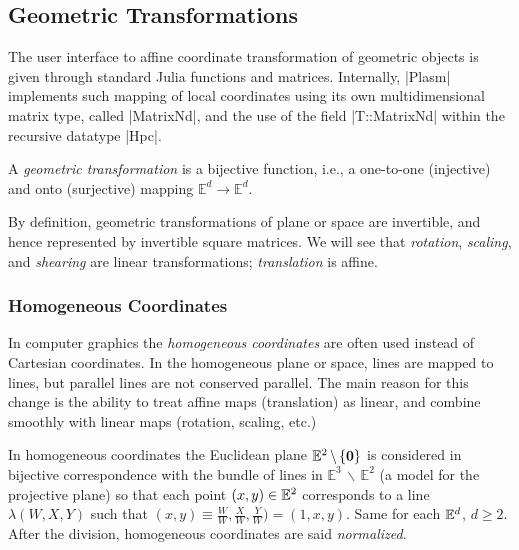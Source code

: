 \subsection{Geometric Transformations}\label{sect:4-2-1}

The user interface to affine coordinate transformation of geometric objects is given through standard Julia functions and matrices. Internally, |Plasm| implements such mapping of local coordinates using its own multidimensional matrix type, called |MatrixNd|, and the use of the field |T::MatrixNd| within the recursive datatype |Hpc|.

\begin{definition}
A \emph{geometric transformation} is a bijective function, i.e., a one-to-one (injective) and onto (surjective) mapping $\mathbb{E}^d \to \mathbb{E}^d$. 
\end{definition}

By definition, geometric transformations of plane or space are invertible, and hence represented by invertible square matrices. We will see that \emph{rotation}, \emph{scaling}, and \emph{shearing} are linear transformations; \emph{translation} is affine. 


\subsubsection*{Homogeneous Coordinates}

In computer graphics the \emph{homogeneous coordinates} are often used instead of Cartesian coordinates. In the homogeneous plane or space, lines are mapped to lines, but parallel lines are not conserved parallel. The main reason for this change is the ability to treat affine maps (translation) as linear, and combine smoothly with linear maps (rotation, scaling, etc.)

In homogeneous coordinates the Euclidean plane $\mathbb{E}^2 \,\backslash\, \{{\mbox{\boldmath $0$}}\}$ is considered in bijective correspondence with the bundle of lines in $\mathbb{E}^3 \,\backslash\, \mathbb{E}^2$ (a model for the projective plane) so that each point $(x,y)\in\mathbb{E}^2$ corresponds to a line $\lambda(W, X, Y)$ such that $(x, y) \equiv \frac{W}{W}, \frac{X}{W}, \frac{Y}{W}) = (1, x, y)$. Same for each $\mathbb{E}^d$, $d \geq 2$. After the division, homogeneous coordinates are said \emph{normalized}.


